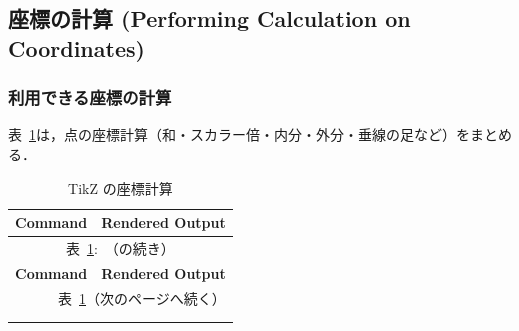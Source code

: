 \documentclass[lualatex]{jlreq}
\begin{document}
\subsection{座標の計算 (Performing Calculation on Coordinates)}

\subsubsection{利用できる座標の計算}

表~\ref{tab:calccoord}は，点の座標計算（和・スカラー倍・内分・外分・垂線の足など）をまとめる．

\renewcommand{\cwD}{11cm}
\renewcommand{\cwE}{4.5cm}
\begin{longtable}{p{\cwD} p{\cwE}}
    \caption{TikZ の座標計算} \label{tab:calccoord}                              \\[-1em]
    \toprule
    \textbf{Command} & \textbf{Rendered Output}                             \\
    \midrule
    \endfirsthead %

    \multicolumn{2}{c}{表~\ref{tab:calccoord}:~\nameref{tab:calccoord}（の続き）} \\[0.3em]
    \toprule
    \textbf{Command} & \textbf{Rendered Output}                             \\
    \midrule
    \endhead %

    \multicolumn{2}{r}{表~\ref{tab:calccoord}（次のページへ続く）}                     \\
    \midrule
    \endfoot %

    \midrule
    \multicolumn{2}{r}{表~\ref{tab:calccoord}終了}                             \\
    \bottomrule
    \endlastfoot %


\end{longtable}
\end{document}
